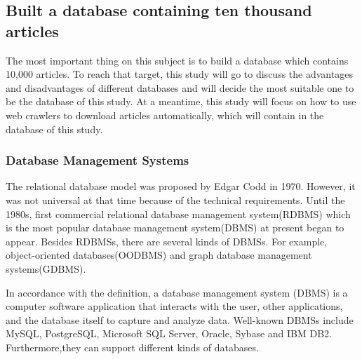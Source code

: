 	
\subsection{Built a database containing ten thousand articles}

The most important thing on this subject is to build a database which contains 10,000 articles.
To reach that target, this study will go to discuss the advantages and disadvantages of different databases and will decide the most suitable one to be the database of this study.
At a meantime, this study will focus on how to use web crawlers to download articles automatically, which will contain in the database of this study.

\subsubsection{Database Management Systems}

The relational database model was proposed by Edgar Codd in 1970.
However, it was not universal at that time because of the technical requirements.
Until the 1980s, first commercial relational database management system(RDBMS) which is the most popular database management system(DBMS) at present began to appear.
Besides RDBMSs, there are several kinds of DBMSs.
For example, object-oriented databases(OODBMS) and graph database management systems(GDBMS).

In accordance with the definition, a database management system (DBMS) is a computer software application that interacts with the user, other applications, and the database itself to capture and analyze data.
Well-known DBMSs include MySQL, PostgreSQL, Microsoft SQL Server, Oracle, Sybase and IBM DB2.
Furthermore,they can support different kinds of databases.

